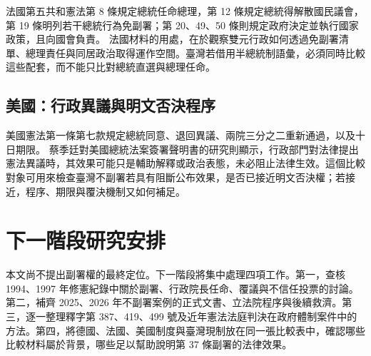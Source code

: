 \documentclass[12pt]{ctexart}
\begin{document}
法國第五共和憲法第 8 條規定總統任命總理，第 12 條規定總統得解散國民議會，第 19 條明列若干總統行為免副署；第 20、49、50 條則規定政府決定並執行國家政策，且向國會負責。\autocite{elysee_constitution} 法國材料的用處，在於觀察雙元行政如何透過免副署清單、總理責任與同居政治取得運作空間。臺灣若借用半總統制語彙，必須同時比較這些配套，而不能只比對總統直選與總理任命。

\subsection{美國：行政異議與明文否決程序}

美國憲法第一條第七款規定總統同意、退回異議、兩院三分之二重新通過，以及十日期限。\autocite{loc_us_constitution_article1} 蔡季廷對美國總統法案簽署聲明書的研究則顯示，行政部門對法律提出憲法異議時，其效果可能只是輔助解釋或政治表態，未必阻止法律生效。這個比較對象可用來檢查臺灣不副署若具有阻斷公布效果，是否已接近明文否決權；若接近，程序、期限與覆決機制又如何補足。

\section{下一階段研究安排}

本文尚不提出副署權的最終定位。下一階段將集中處理四項工作。第一，查核 1994、1997 年修憲紀錄中關於副署、行政院長任命、覆議與不信任投票的討論。第二，補齊 2025、2026 年不副署案例的正式文書、立法院程序與後續救濟。第三，逐一整理釋字第 387、419、499 號及近年憲法法庭判決在政府體制案件中的方法。第四，將德國、法國、美國制度與臺灣現制放在同一張比較表中，確認哪些比較材料屬於背景，哪些足以幫助說明第 37 條副署的法律效果。

\printbibliography
\end{document}
